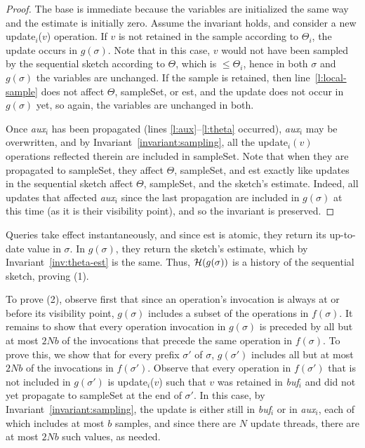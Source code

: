 \begin{proof}
 The base is immediate because the variables are initialized the same way and the estimate is initially zero.
Assume the invariant holds, and consider a new update$_i$($v$) operation. If $v$ is not retained 
in the sample according to $\Theta_i$, the update occurs in $g(\sigma)$. Note that in this case, 
$v$ would not have been sampled by the sequential sketch  
according to $\Theta$, which is $\le \Theta_i$, hence in both $\sigma$ and $g(\sigma)$ the variables are unchanged.
If the sample is retained, then line~\ref{l:local-sample} does not affect $\Theta$, sampleSet, or est,
and the update does not occur in $g(\sigma)$ yet, so again, the variables are unchanged in both.

Once \emph{aux$_i$} has been propagated (lines \ref{l:aux}--\ref{l:theta} occurred), 
 \emph{aux$_i$} may be overwritten, and by Invariant~\ref{invariant:sampling}, all the update$_i(v)$ operations 
reflected therein are included in sampleSet. Note that when they are propagated to sampleSet, they affect 
 $\Theta$, sampleSet, and est exactly like updates in the sequential sketch affect $\Theta$, sampleSet, and 
 the sketch's estimate. 
 Indeed, all updates that affected \emph{aux$_i$} since the last propagation are 
included in $g(\sigma)$ at this time (as it is their visibility point), and so the invariant is preserved. 
\end{proof}

Queries take effect instantaneously, and since est is  atomic, they return its up-to-date value in $\sigma$. 
In $g(\sigma)$, they return the sketch's estimate, which by Invariant~\ref{inv:theta-est} is the same.
Thus, ${\cal H}(g(\sigma))$ is a history of the sequential sketch, proving (1). 

To prove (2), observe first that since an operation's invocation is always at or before its 
visibility point, $g(\sigma)$ includes a subset of the operations in $f(\sigma)$. 
It remains to show  that every operation invocation in $g(\sigma)$ is preceded by all 
but at most $2Nb$  of the invocations that precede the same operation in $f(\sigma)$. 
To prove this, we show that for every prefix $\sigma'$ of $\sigma$, $g(\sigma')$ includes all 
but at most $2Nb$  of the invocations in $f(\sigma')$.
Observe that 
every operation in $f(\sigma')$ that is not included in $g(\sigma')$ is update$_i$($v$) such that $v$
was  retained in \emph{buf$_i$} and did not yet propagate to sampleSet at the end of $\sigma'$. 
In this case, by Invariant~\ref{invariant:sampling}, 
the update is either still in  \emph{buf$_i$} or in  \emph{aux$_i$}, each of which 
includes at most $b$ samples, and since there are $N$ update threads, there are at most $2Nb$ 
such values, as needed. 


